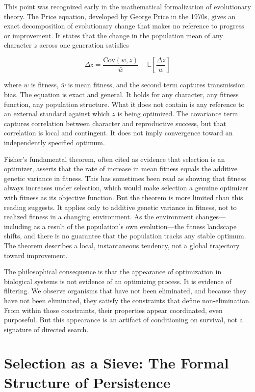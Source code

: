 \documentclass[12pt, a4paper, oneside]{article}
\theoremstyle{plain}
\theoremstyle{definition}
\theoremstyle{remark}
\begin{document}
This point was recognized early in the mathematical formalization of evolutionary theory. The Price equation, developed by George Price in the 1970s, gives an exact decomposition of evolutionary change that makes no reference to progress or improvement. It states that the change in the population mean of any character $z$ across one generation satisfies

\begin{equation}
\Delta \bar{z} = \frac{\text{Cov}(w, z)}{\bar{w}} + \mathbb{E}\left[\frac{\Delta z}{w}\right]
\end{equation}

where $w$ is fitness, $\bar{w}$ is mean fitness, and the second term captures transmission bias. The equation is exact and general. It holds for any character, any fitness function, any population structure. What it does not contain is any reference to an external standard against which $z$ is being optimized. The covariance term captures correlation between character and reproductive success, but that correlation is local and contingent. It does not imply convergence toward an independently specified optimum.

Fisher's fundamental theorem, often cited as evidence that selection is an optimizer, asserts that the rate of increase in mean fitness equals the additive genetic variance in fitness. This has sometimes been read as showing that fitness always increases under selection, which would make selection a genuine optimizer with fitness as its objective function. But the theorem is more limited than this reading suggests. It applies only to additive genetic variance in fitness, not to realized fitness in a changing environment. As the environment changes---including as a result of the population's own evolution---the fitness landscape shifts, and there is no guarantee that the population tracks any stable optimum. The theorem describes a local, instantaneous tendency, not a global trajectory toward improvement.

The philosophical consequence is that the appearance of optimization in biological systems is not evidence of an optimizing process. It is evidence of filtering. We observe organisms that have not been eliminated, and because they have not been eliminated, they satisfy the constraints that define non-elimination. From within those constraints, their properties appear coordinated, even purposeful. But this appearance is an artifact of conditioning on survival, not a signature of directed search.

\section{Selection as a Sieve: The Formal Structure of Persistence}
\end{document}
